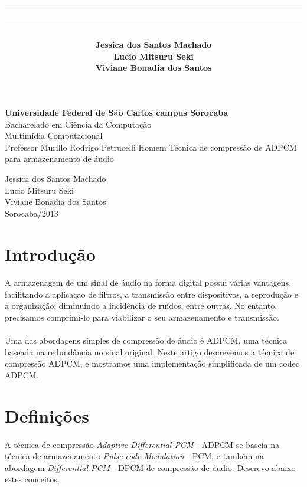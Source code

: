 \documentclass[a4paper,12pt]{article}
\title{\hrule\vspace{1pt}\hrule\vspace{25pt}}
\author{\LARGE \bf 
Jessica dos Santos Machado\\
Lucio Mitsuru Seki\\
Viviane Bonadia dos Santos}
\date{\Large \bf Fevereiro de 2012 \vspace{25pt}\hrule\vspace{1pt}\hrule}
\begin{document}
\pagestyle{empty}
\onehalfspacing
\begin{center}
{\Large \bf Universidade Federal de São Carlos campus Sorocaba}\\[15pt]
{\Large Bacharelado em Ciência da Computação}\\[15pt]
{\Large Multimídia Computacional\\ Professor Murillo Rodrigo Petrucelli Homem}
\vfill
\vfill
{\Large Técnica de compressão de ADPCM para armazenamento de áudio}
\vfill
\vfill

{\Large Jessica dos Santos Machado\\
Lucio Mitsuru Seki\\
Viviane Bonadia dos Santos}\\
\bigskip
{Sorocaba/2013}
\end{center}

\newpage

\section{Introdução}

\paragraph{}
A armazenagem de um sinal de áudio na forma digital possui várias vantagens, facilitando a aplicaçao de filtros, a transmissão entre dispositivos, a reprodução e a organização; diminuindo a incidência de ruídos, entre outras. No entanto, precisamos comprimí-lo para viabilizar o seu armazenamento e transmissão.

\paragraph{}
Uma das abordagens simples de compressão de áudio é ADPCM, uma técnica baseada na redundância no sinal original. Neste artigo descrevemos a técnica de compressão ADPCM, e mostramos uma implementação simplificada de um codec ADPCM.

\section{Definições}

\paragraph{}
A técnica de compressão \textit{Adaptive Differential PCM} - ADPCM se baseia na técnica de armazenamento \textit{Pulse-code Modulation} - PCM, e também na abordagem \textit{Differential PCM} - DPCM de compressão de áudio. Descrevo abaixo estes conceitos.
\end{document}
